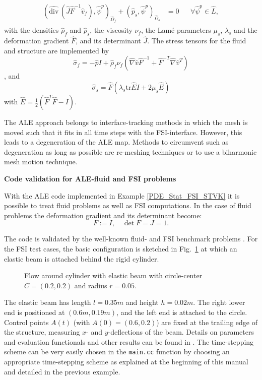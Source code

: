 \begin{Problem}
\begin{eqnarray*}
\begin{aligned}
      (\widehat{\text{div}}\,(\hat J\hat F^{-1}
      \hat v_f),\hat\psi^p)_{\hat\Omega_f} 
      + (\hat p_s ,\hat \psi^p)_{\hat\Omega_s}
      &=0&&\forall\hat\psi^p\in \hat L,
    \end{aligned}
  \end{eqnarray*}  
  with the densities $\hat\rho_f$ and $\hat\rho_s$, 
the viscosity $\nu_f$, the Lam\'e parameters 
$\mu_s$, $\lambda_s$ and the deformation gradient $\hat F$, and its
determinant $\hat J$. The stress tensors for the fluid and structure are
implemented by 
\[
\hat\sigma_f = -\hat pI + \hat\rho_f\nu_f (\hat\nabla\hat v \hat F^{-1}
  + \hat F^{-T} \hat\nabla\hat v^T)
\], 
and 
\[
\hat\sigma_s = \hat F (\lambda_s \text{tr}\hat E I + 2\mu_s \hat E)
\]
with $\hat E = \frac{1}{2}(\hat F^T \hat F - I)$.
\end{Problem}
The ALE approach belongs to interface-tracking methods in which 
the mesh is moved such that it fits in all time steps with 
the FSI-interface. However, this leads to 
a degeneration of the ALE map. Methods to circumvent such as 
degeneration as long as possible are re-meshing techniques or 
to use a biharmonic mesh motion technique.






{\bf Code validation for ALE-fluid and FSI problems}

With the ALE code implemented in Example 
\ref{PDE_Stat_FSI_STVK} it is possible to treat fluid 
problems as well as FSI computations. 
In the case of fluid problems the deformation
gradient and its determinant become:
\begin{equation*}
F:= I , \quad \det F = J = 1.
\end{equation*}

The code is validated by the well-known 
fluid- and FSI benchmark problems \cite{SchaeTu96, HrTu06b}. 
For the FSI test cases, 
the basic configuration is 
sketched in Fig.~\ref{configuration_csm_and_fsi_2D} 
at which an elastic beam is attached 
behind the rigid cylinder. 

\begin{figure}[h]
\centering

\caption{Flow around cylinder with elastic beam with 
circle-center $C=(0.2,0.2)$ and radius $r=0.05$.}
\label{configuration_csm_and_fsi_2D}
\end{figure}


The elastic beam has length
$l=0.35m$ and height $h=0.02m$. The right lower end is positioned at 
$(0.6m,0.19m)$, and
the left end is attached to the circle. 
Control points $A(t)$ (with $A(0) = (0.6,0.2)$) are fixed at the 
trailing edge of the structure, measuring $x$- and $y$-deflections of the beam.
Details 
on parameters and evaluation functionals and other results 
can be found in \cite{HrTu06b,BuSc06,Wi11}. 
The time-stepping scheme can be 
very easily chosen in the \texttt{main.cc} function by choosing an appropriate 
time-stepping scheme as explained at the beginning of this manual
and detailed in the previous example.

